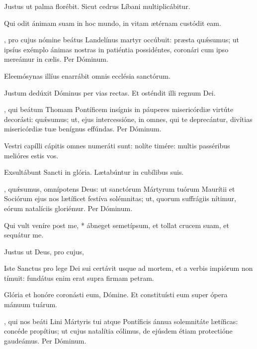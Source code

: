 \documentclass[fontsize=9pt,paper=A6,twoside,BCOR=1mm,DIV=22,headinclude]{scrarticle}
\begin{document}
\begin{multicols}{2}
\V Justus ut palma florébit.
\R Sicut cedrus Líbani multiplicábitur.

\B Qui odit ánimam suam in hoc mundo, in vitam ætérnam custódit eam.

, pro cujus nómine beátus Landelínus martyr occúbuit: præsta qu\'æsumus; ut ipsíus exémplo ánimas nostras in patiéntia possidéntes, coronári cum ipso mereámur in cælis. \red{(}Per Dóminum.\red{)}


\A Eleemósynas illíus enarrábit omnis ecclésia sanctórum.

\V Justum dedúxit Dóminus per vias rectas.
\R Et osténdit illi regnum Dei.

, qui beátum Thomam Pontíficem insígnis in páuperes misericórdiæ virtúte decorásti: quǽsumus; ut, ejus intercessióne, in omnes, qui te deprecántur, divítias misericórdiæ tuæ benígnus effúndas. \red{(}Per Dóminum.\red{)}


\Ant Vestri capílli cápitis omnes numeráti sunt: nolíte timére: multis passéribus melióres estis vos.

\V Exsultábunt Sancti in glória.
\R Lætabúntur in cubílibus suis.

, quǽsumus, omnípotens Deus: ut sanctórum Mártyrum tuórum Maurítii et Sociórum ejus nos lætíficet festíva solémnitas; ut, quorum suffrágiis nítimur, eórum natalíciis gloriémur. Per Dóminum.


\M Qui vult veníre post me, * ábneget semetípsum, et tollat crucem suam, et sequátur me.

\V Justus ut  Deus, pro cujus, 


\Ant Iste Sanctus pro lege Dei sui certávit usque ad mortem, et a verbis impiórum non tímuit: fundátus enim erat supra firmam petram.

\V Glória et honóre coronásti eum, Dómine.
\R Et constituísti eum super ópera mánuum tuárum.

, qui nos beáti Lini Mártyris tui atque Pontíficis ánnua solemnitáte lætíficas: concéde propítius; ut cujus natalítia cólimus, de ejúsdem étiam protectióne gaudeámus. \red{(}Per Dóminum.\red{)}


\end{multicols}
\end{document}
